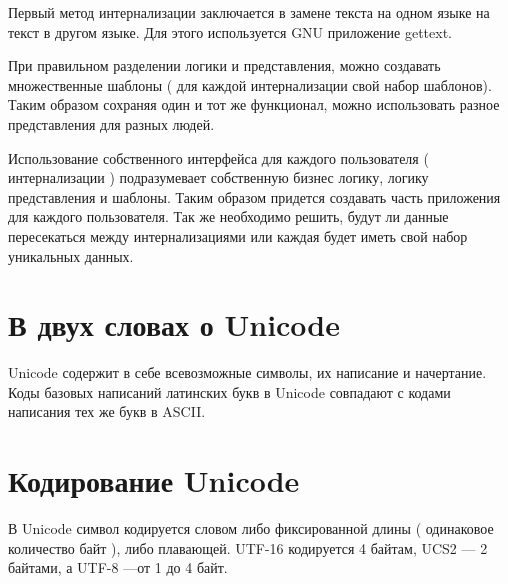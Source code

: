
Первый метод интернализации заключается в замене текста на одном языке на текст в другом языке. Для этого используется GNU приложение gettext.


При правильном разделении логики и представления, можно создавать множественные шаблоны ( для каждой интернализации свой набор шаблонов). Таким образом сохраняя один и тот же функционал, можно использовать разное представления для разных людей.



Использование собственного интерфейса для каждого пользователя ( интернализации ) подразумевает собственную бизнес логику, логику представления и шаблоны. Таким образом  придется создавать часть приложения для каждого пользователя. Так же необходимо решить, будут ли данные пересекаться между интернализациями или каждая будет иметь свой набор уникальных данных.

\section{В двух словах о Unicode} \label{sect3_4}

Unicode содержит в себе всевозможные символы, их написание и начертание. Коды базовых написаний латинских букв в Unicode совпадают с кодами написания тех же букв в ASCII. 


\section{Кодирование Unicode} \label{sect3_5}

В Unicode символ кодируется словом либо фиксированной длины ( одинаковое количество байт ), либо плавающей. UTF-16 кодируется 4 байтам, UCS2 --- 2 байтами,  а UTF-8 ---от 1 до 4 байт.

